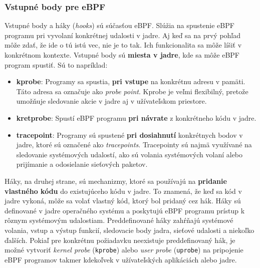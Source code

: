 \subsubsection{Vstupné body pre eBPF}
\label{sec:hooks}
Vstupné body a háky (\emph{hooks}) sú súčasťou eBPF. Slúžia na spustenie eBPF programu pri vyvolaní konkrétnej udalosti v jadre. 
Aj keď sa na prvý pohľad môže zdať, že ide o tú istú vec, nie je to tak. Ich funkcionalita sa môže líšiť v konkrétnom kontexte. 
Vstupné body sú \textbf{miesta v jadre}, kde sa môže eBPF program spustiť. Sú to napríklad:
\begin{itemize}
    \item \textbf{kprobe}: Programy sa spustia, \textbf{pri vstupe} na konkrétnu adresu v pamäti. 
    Táto adresa sa označuje ako \emph{probe point}. Kprobe je veľmi flexibilný, pretože umožňuje 
    sledovanie akcie v jadre aj v užívateľskom priestore.
    \item \textbf{kretprobe}: Spustí eBPF programu \textbf{pri návrate} z konkrétneho kódu v jadre.
    \item \textbf{tracepoint}: Programy sú spustené \textbf{pri dosiahnutí} konkrétnych bodov v jadre, 
    ktoré sú označené ako \emph{tracepoints}. Tracepointy sú najmä využívané na sledovanie systémových 
    udalostí, ako sú volania systémových volaní alebo prijímanie a odosielanie sieťových paketov.
\end{itemize}
Háky, na druhej strane, sú mechanizmy, ktoré sa používajú na \textbf{pridanie vlastného kódu} do existujúceho kódu v jadre. 
To znamená, že keď sa kód v jadre vykoná, môže sa volať vlastný kód, ktorý bol pridaný cez hák. Háky sú definované v 
jadre operačného systému a poskytujú eBPF programu prístup k rôznym systémovým udalostiam. Preddefinované háky zahŕňajú 
systémové volania, vstup a výstup funkcií, sledovacie body jadra, sieťové udalosti a niekoľko ďalších. Pokiaľ pre konkrétnu 
požiadavku neexistuje preddefinovaný hák, je možné vytvoriť \emph{kernel probe} (\texttt{kprobe}) alebo \emph{user probe} (\texttt{uprobe}) 
na pripojenie eBPF programov takmer kdekoľvek v užívateľských aplikáciách alebo jadre.~\cite{eBPF, book1, kernel, oracle}

